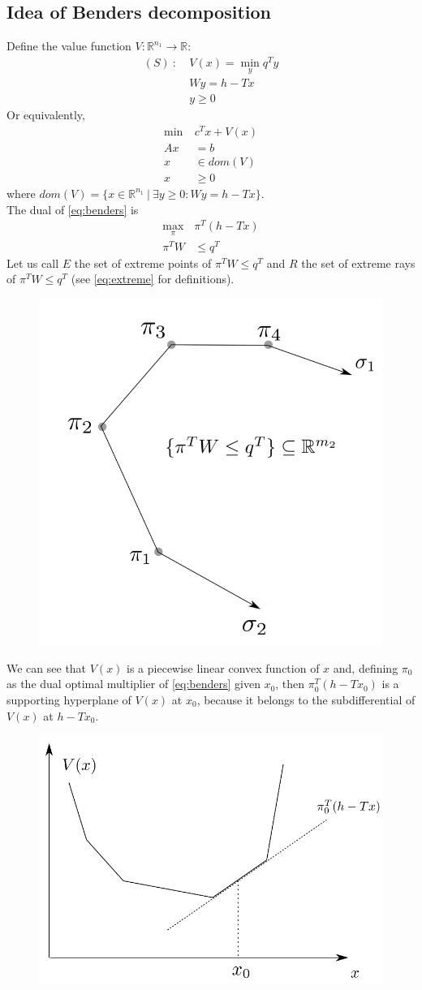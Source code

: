 \documentclass[12pt, openany]{report}
\newcommand{\R}{\mathbb{R}}
\theoremstyle{definition}
\begin{document}
\subsection{Idea of Benders decomposition}
Define the value function $V:\R^{n_1}\to \R$:
\begin{equation}\label{eq:benders}
	\begin{aligned}
		(S)\ :\ &V(x) = \min_yq^Ty\\
		&Wy=h-Tx\\
		&y\geq0
	\end{aligned}
\end{equation}
Or equivalently,
\begin{equation}
	\begin{aligned}
		\min \ &c^Tx+V(x)\\
		Ax&=b\\
		x&\in dom(V)\\
		x&\ge 0
	\end{aligned}
\end{equation}
where $dom(V) = \{x\in \R^{n_1}\ |\ \exists y\geq0:Wy=h-Tx\}$.\\
The dual of \eqref{eq:benders} is 
\begin{equation}
	\begin{aligned}
		\max_{\pi}& \pi^T(h-Tx)\\
		\pi^TW&\le q^T
	\end{aligned}
\end{equation}
Let us call $E$ the set of extreme points of $\pi^TW\le q^T$ and $R$ the set of extreme rays of $\pi^TW\le q^T$ (see \eqref{eq:extreme} for definitions). 
\begin{figure}[H]
	\centering
	\includegraphics[width=.35\textwidth]{img/extreme.png}
\end{figure}
We can see that $V(x)$ is a piecewise linear convex function of $x$ and, defining $\pi_0$ as the dual optimal multiplier of \eqref{eq:benders} given $x_0$, then $\pi_0^T(h-Tx_0)$ is a supporting hyperplane of $V(x)$ at $x_0$, because it belongs to the subdifferential of $V(x)$ at $h-Tx_0$.
\begin{figure}[H]
	\centering
	\includegraphics[width=.5\textwidth]{img/supporting_hyperplane.png}
\end{figure}
\end{document}
